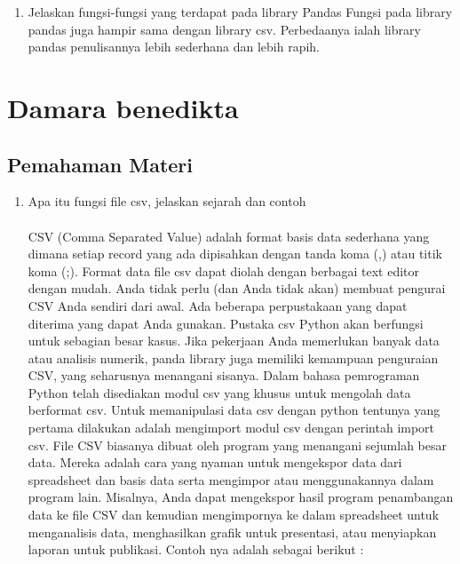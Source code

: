 \begin{enumerate}
\item Jelaskan fungsi-fungsi yang terdapat pada library Pandas
Fungsi pada library pandas juga hampir sama dengan library csv. Perbedaanya ialah library pandas penulisannya lebih sederhana dan lebih rapih.

\end{enumerate}


\section{Damara benedikta}
\subsection{Pemahaman Materi}
\begin{enumerate}
\item Apa itu fungsi ﬁle csv, jelaskan sejarah dan contoh
\paragraph{} CSV (Comma Separated Value) adalah format basis data sederhana yang dimana setiap record yang ada dipisahkan dengan tanda koma (,) atau titik koma (;). Format data file csv dapat diolah dengan berbagai text editor dengan mudah. Anda tidak perlu (dan Anda tidak akan) membuat pengurai CSV Anda sendiri dari awal. Ada beberapa perpustakaan yang dapat diterima yang dapat Anda gunakan. Pustaka csv Python akan berfungsi untuk sebagian besar kasus. Jika pekerjaan Anda memerlukan banyak data atau analisis numerik, panda library juga memiliki kemampuan penguraian CSV, yang seharusnya menangani sisanya. Dalam bahasa pemrograman Python telah disediakan modul csv yang khusus untuk mengolah data berformat csv.  Untuk memanipulasi data csv dengan python tentunya yang pertama dilakukan adalah mengimport modul csv dengan perintah import csv. File CSV biasanya dibuat oleh program yang menangani sejumlah besar data. Mereka adalah cara yang nyaman untuk mengekspor data dari spreadsheet dan basis data serta mengimpor atau menggunakannya dalam program lain. Misalnya, Anda dapat mengekspor hasil program penambangan data ke file CSV dan kemudian mengimpornya ke dalam spreadsheet untuk menganalisis data, menghasilkan grafik untuk presentasi, atau menyiapkan laporan untuk publikasi. Contoh nya adalah sebagai berikut :

 


\end{enumerate}
